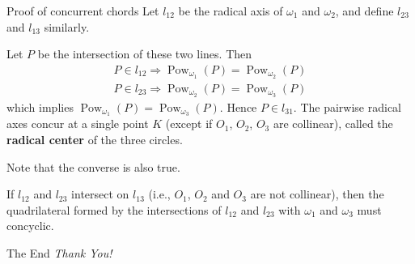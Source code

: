 \documentclass{beamer}
\DeclareMathOperator{\Pow}{Pow}
\begin{document}
\begin{frame}{Proof of concurrent chords}
	Let $l_{12}$ be the radical axis of $\omega_1$ and  $\omega_2$,  and define $l_{23}$ and $l_{13}$ similarly. 

	Let $P$ be the intersection of these two lines. Then
	\begin{equation*}
		\begin{split}
			P \in l_{12} \Rightarrow \Pow_{\omega_1}(P) = \Pow_{\omega_2}(P) \\
			P \in l_{23} \Rightarrow \Pow_{\omega_2}(P) = \Pow_{\omega_3}(P)
		\end{split}
	\end{equation*}
	which implies $\Pow_{\omega_1}(P) = \Pow_{\omega_3}(P)$. Hence  $P \in l_{31}$. The pairwise radical axes concur at a single point $K$ (except if $O_1$, $O_2$, $O_3$ are collinear), called the \textbf{radical center} of the three circles.

	Note that the converse is also true.
	\begin{theorem}
		If $l_{12}$ and $l_{23}$ intersect on $l_{13}$ (i.e., $O_1$, $O_2$ and $O_3$ are not collinear), then the quadrilateral formed by the intersections of $l_{12}$ and $l_{23} $ with $\omega_1$ and $\omega_3$ must concyclic.
	\end{theorem}
\end{frame}
\begin{frame}{The End}
	\centering \Large
	\emph{Thank You!}
\end{frame}
\end{document}
